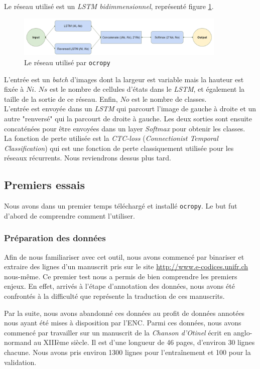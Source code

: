 \documentclass{report}
\begin{document}
Le réseau utilisé est un \textit{LSTM bidimmensionnel}, représenté figure \ref{nn}.

\begin{figure}[!h] 
	\center
	\includegraphics[width=10cm]{nn.png}
	\caption{Le réseau utilisé par \texttt{ocropy}}
	\label{nn}
\end{figure}

L'entrée est un \textit{batch} d'images dont la largeur est variable mais la hauteur est fixée à $Ni$. $Ns$ est le nombre de cellules d'états dans le \textit{LSTM}, et également la taille de la sortie de ce réseau. Enfin, $No$ est le nombre de classes. \\
L'entrée est envoyée dans un \textit{LSTM} qui parcourt l'image de gauche à droite et un autre "renversé" qui la parcourt de droite à gauche. Les deux sorties sont ensuite concaténées pour être envoyées dans un layer \textit{Softmax} pour obtenir les classes. \\
La fonction de perte utilisée est la \textit{CTC-loss} (\textit{Connectionist Temporal Classification}) qui est une fonction de perte classiquement utilisée pour les réseaux récurrents. Nous reviendrons dessus plus tard.

\subsection{Premiers essais}

Nous avons dans un premier temps téléchargé et installé \texttt{ocropy}.
Le but fut d'abord de comprendre comment l'utiliser.

\subsubsection{Préparation des données}

Afin de nous familiariser avec cet outil, nous avons commencé par binariser et extraire des lignes d'un manuscrit pris sur le site \url{http://www.e-codices.unifr.ch} nous-même.
Ce premier test nous a permis de bien comprendre les premiers enjeux.
En effet, arrivés à l'étape d'annotation des données, nous avons été confrontés à la difficulté que représente la traduction de ces manuscrits.

Par la suite, nous avons abandonné ces données au profit de données annotées nous ayant été mises à disposition par l'ENC.
Parmi ces données, nous avons commencé par travailler sur un manuscrit de la \textit{Chanson d'Otinel} écrit en anglo-normand au XIIIème siècle.
Il est d'une longueur de 46 pages, d'environ 30 lignes chacune. Nous avons pris environ 1300 lignes pour l'entraînement et 100 pour la validation.
\end{document}
